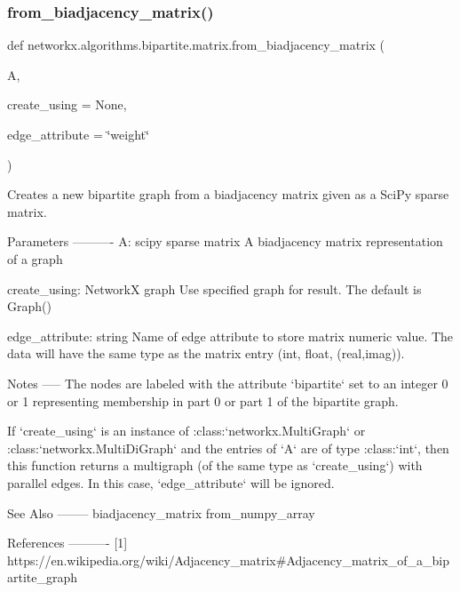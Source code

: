 \subsubsection{\texorpdfstring{from\+\_\+biadjacency\+\_\+matrix()}{from\_biadjacency\_matrix()}}
{\footnotesize\ttfamily def networkx.\+algorithms.\+bipartite.\+matrix.\+from\+\_\+biadjacency\+\_\+matrix (\begin{DoxyParamCaption}\item[{}]{A,  }\item[{}]{create\+\_\+using = {\ttfamily None},  }\item[{}]{edge\+\_\+attribute = {\ttfamily \char`\"{}weight\char`\"{}} }\end{DoxyParamCaption})}

\begin{DoxyVerb}Creates a new bipartite graph from a biadjacency matrix given as a
SciPy sparse matrix.

Parameters
----------
A: scipy sparse matrix
  A biadjacency matrix representation of a graph

create_using: NetworkX graph
   Use specified graph for result.  The default is Graph()

edge_attribute: string
   Name of edge attribute to store matrix numeric value. The data will
   have the same type as the matrix entry (int, float, (real,imag)).

Notes
-----
The nodes are labeled with the attribute `bipartite` set to an integer
0 or 1 representing membership in part 0 or part 1 of the bipartite graph.

If `create_using` is an instance of :class:`networkx.MultiGraph` or
:class:`networkx.MultiDiGraph` and the entries of `A` are of
type :class:`int`, then this function returns a multigraph (of the same
type as `create_using`) with parallel edges. In this case, `edge_attribute`
will be ignored.

See Also
--------
biadjacency_matrix
from_numpy_array

References
----------
[1] https://en.wikipedia.org/wiki/Adjacency_matrix#Adjacency_matrix_of_a_bipartite_graph
\end{DoxyVerb}
 